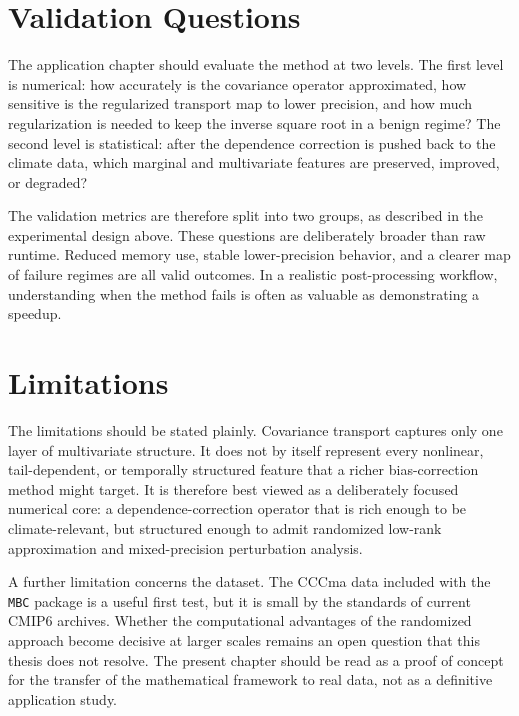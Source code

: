 \section{Validation Questions}

The application chapter should evaluate the method at two levels. The first level is
numerical: how accurately is the covariance operator approximated, how sensitive
is the regularized transport map to lower precision, and how much regularization is
needed to keep the inverse square root in a benign regime? The second level is
statistical: after the dependence correction is pushed back to the climate data,
which marginal and multivariate features are preserved, improved, or degraded?

The validation metrics are therefore split into two groups, as described in the
experimental design above. These questions are deliberately broader than raw
runtime. Reduced memory use, stable lower-precision behavior, and a clearer map of
failure regimes are all valid outcomes. In a realistic post-processing workflow,
understanding when the method fails is often as valuable as demonstrating a
speedup.

\section{Limitations}

The limitations should be stated plainly. Covariance transport captures only one
layer of multivariate structure. It does not by itself represent every nonlinear,
tail-dependent, or temporally structured feature that a richer bias-correction
method might target. It is therefore best viewed as a deliberately focused
numerical core: a dependence-correction operator that is rich enough to be
climate-relevant, but structured enough to admit randomized low-rank approximation
and mixed-precision perturbation analysis.

A further limitation concerns the dataset. The CCCma data included with the
\texttt{MBC} package is a useful first test, but it is small by the standards of
current CMIP6 archives. Whether the computational advantages of the randomized
approach become decisive at larger scales remains an open question that this thesis
does not resolve. The present chapter should be read as a proof of concept for the
transfer of the mathematical framework to real data, not as a definitive
application study.
